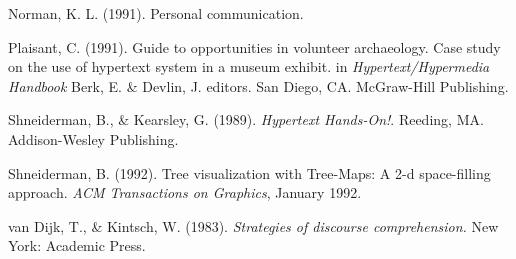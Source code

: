 \documentclass[twocolumn,10pt]{article}
\begin{document}
\begin{thebibliography}{99}
  Norman, K. L. (1991). Personal communication. 

  Plaisant, C. (1991).
  Guide to opportunities in volunteer archaeology. Case study
  on the use of hypertext system in a museum exhibit.
  in {\em Hypertext/Hypermedia Handbook}
  Berk, E. \& Devlin, J. editors.
  San Diego, CA. McGraw-Hill Publishing.

  Shneiderman, B., \& Kearsley, G. (1989).
  {\em Hypertext Hands-On!}. Reeding, MA. Addison-Wesley Publishing.

  Shneiderman, B. (1992).
  Tree visualization with Tree-Maps: A 2-d space-filling approach.
  {\em ACM Transactions on Graphics}, January 1992.

  van Dijk, T., \& Kintsch, W. (1983). {\em Strategies of discourse 
  comprehension.}
  New York: Academic Press.



\end{thebibliography}
\end{document}
